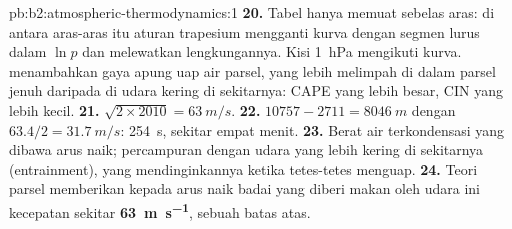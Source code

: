 \begin{solution}{pb:b2:atmospheric-thermodynamics:1}
\textbf{20.} Tabel hanya memuat sebelas aras: di antara aras-aras itu aturan trapesium mengganti
kurva dengan segmen lurus dalam $\ln p$ dan melewatkan lengkungannya. Kisi \qty{1}{hPa} mengikuti kurva. 
menambahkan gaya apung uap air parsel, yang lebih melimpah di dalam parsel jenuh daripada di
udara kering di sekitarnya: CAPE yang lebih besar, CIN yang lebih kecil.
\textbf{21.} $\sqrt{2 \times 2010} = \qty{63}{m/s}$.
\textbf{22.} $10757 - 2711 = \qty{8046}{m}$ dengan $63.4/2 = \qty{31.7}{m/s}$: \qty{254}{s}, sekitar empat
menit.
\textbf{23.} Berat air terkondensasi yang dibawa arus naik; percampuran dengan udara yang lebih kering
di sekitarnya (entrainment), yang mendinginkannya ketika tetes-tetes menguap.
\textbf{24.} Teori parsel memberikan kepada arus naik badai yang diberi makan oleh udara ini kecepatan sekitar
\textbf{\qty[text-series-to-math=true]{63}{m.s^{-1}}}, sebuah batas atas.
\end{solution}
